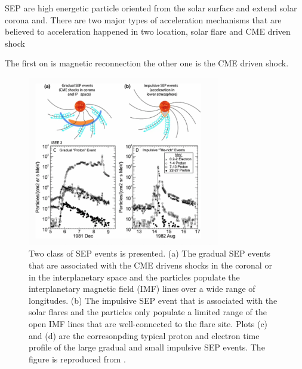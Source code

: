SEP are high energetic particle oriented from the solar surface and extend solar corona and. 
There are two major types of acceleration mechanisms that are believed to 
acceleration happened in two location, solar flare  and CME driven shock

The first on is magnetic reconnection
the other one is the CME driven shock.



\begin{figure}
	\centering
	\includegraphics[width = 0.75\textwidth]{images/SEP_two_type.png}
	\caption[Two type of Solar energetic particle (SEP) event]{Two class of SEP events is presented. (a) The gradual SEP events that are associated with the CME drivens shocks in the coronal or in the interplanetary space and the particles populate the interplanetary magnetic field (IMF) lines over a wide range of longitudes. (b) The impulsive SEP event that is associated with the solar flares and the particles only populate a limited range of the open IMF lines that are well-connected to the flare site. Plots (c) and (d) are the corresonpding typical proton and electron time profile of the large gradual and small impulsive SEP events. The figure is reproduced from \citet{Desai_Diacalone2016LRSP}.}
	\label{Fig:two_type_SEP}
\end{figure}

